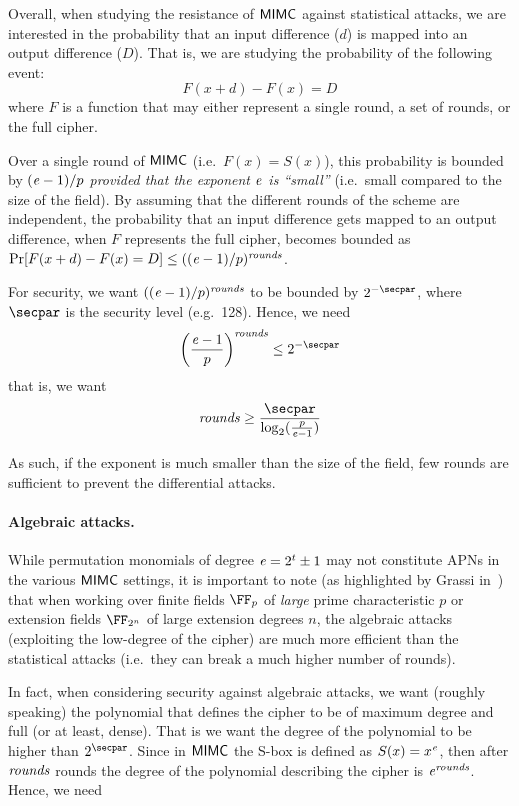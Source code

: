 \medskip

Overall, when studying the resistance of $\mathsf{MIMC{}}$ against statistical attacks, we are interested in the probability that an input difference ($d$) is mapped into an output difference ($D$). That is, we are studying the probability of the following event:
\[
    F(x + d) - F(x) = D
\]
where $F$ is a function that may either represent a single round, a set of rounds, or the full cipher.

Over a single round of $\mathsf{MIMC{}}$ (i.e.~$F(x) = S(x)$), this probability is bounded by $(\mathit{e}{}-1)/p$ \emph{provided that the exponent $\mathit{e}{}$ is ``small''} (i.e.~small compared to the size of the field).
By assuming that the different rounds of the scheme are independent, the probability that an input difference gets mapped to an output difference, when $F$ represents the full cipher, becomes bounded as $\Pr[F(x + d) - F(x) = D] \leq ((\mathit{e}{}-1)/p)^{\mathit{rounds}}$.

For security, we want $((\mathit{e}{}-1)/p)^{\mathit{rounds}}$ to be bounded by $2^{-\secpar}$, where $\secpar$ is the security level (e.g.~128). Hence, we need
\[
    \left(\frac{\exponent{}-1}{p}\right)^\rounds \leq 2^{-\secpar}
\]
that is, we want
\[
    \rounds \geq \frac{\secpar}{\log_2(\frac{p}{\exponent{}-1})}
\]

As such, if the exponent is much smaller than the size of the field, few rounds are sufficient to prevent the differential attacks.

\paragraph{Algebraic attacks.}

While permutation monomials of degree $\mathit{e}{} = 2^t \pm 1$ may not constitute APNs in the various $\mathsf{MIMC{}}$ settings, it is important to note (as highlighted by Grassi in~\cite{mimc-security-communications}) that when working over finite fields $\FFx{p}$ of \emph{large} prime characteristic $p$ or extension fields $\FFx{2^n}$ of large extension degrees $n$, the algebraic attacks (exploiting the low-degree of the cipher) are much more efficient than the statistical attacks (i.e.~they can break a much higher number of rounds).

In fact, when considering security against algebraic attacks, we want (roughly speaking) the polynomial that defines the cipher to be of maximum degree and full (or at least, dense). That is we want the degree of the polynomial to be higher than $2^{\secpar}$. Since in $\mathsf{MIMC{}}$ the S-box is defined as $S(x) = x^{\mathit{e}{}}$, then after $\mathit{rounds}$ rounds the degree of the polynomial describing the cipher is $\mathit{e}{}^{\mathit{rounds}}$. Hence, we need

